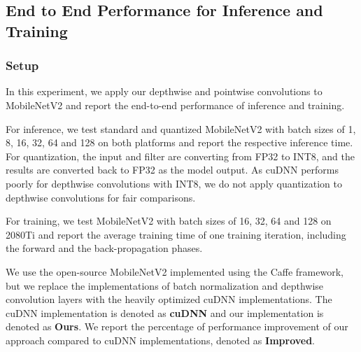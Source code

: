 \subsection{End to End Performance for Inference and Training}
\label{sec:inferexp}
\subsubsection{Setup}
In this experiment, we apply our depthwise and pointwise convolutions to MobileNetV2 and report the end-to-end performance of inference and
training.

 For inference, we test standard and quantized MobileNetV2 with batch sizes of 1, 8, 16, 32, 64 and 128 on both
platforms and report the respective inference time. For quantization, the input and filter are converting from FP32 to INT8, and the
results are converted back to FP32 as the model output. As cuDNN performs poorly for depthwise convolutions with INT8, we do not apply
quantization to depthwise convolutions for fair comparisons.

 For training, we test MobileNetV2 with batch sizes of 16, 32, 64 and 128 on 2080Ti and report the average training time
of one training iteration, including the forward and the back-propagation phases.

 We use the open-source MobileNetV2 implemented using the Caffe framework, but we replace the
implementations of batch normalization and depthwise convolution layers with the heavily optimized cuDNN implementations. The cuDNN
implementation is denoted as \textbf{cuDNN} and our implementation is denoted as \textbf{Ours}. We report the percentage of performance
improvement of our approach compared to cuDNN implementations, denoted as \textbf{Improved}.


